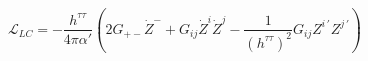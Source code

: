 \begin{equation} \label{eq:LC Lagrangian}
    \mathcal{L}_{LC}=-\frac{h^{\tau\tau}}{4\pi\alpha'} \left(
    2 G_{+-} \dot Z^- +  G_{ij} \dot Z^i \dot Z^j -
    \frac{1}{(h^{\tau\tau})^2} G_{ij} Z^{i\,\prime} Z^{j\,\prime}
    \right)
\end{equation}

